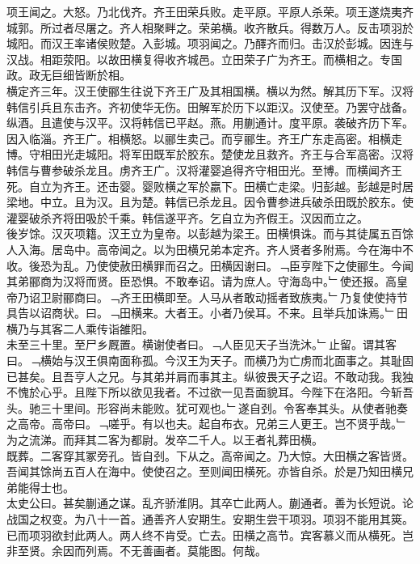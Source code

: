 \documentclass{zhvt-classic}
\begin{document}
\hspace*{2em}项王闻之。大怒。乃北伐齐。齐王田荣兵败。走平原。平原人杀荣。项王遂烧夷齐城郭。所过者尽屠之。齐人相聚畔之。荣弟横。收齐散兵。得数万人。反击项羽於城阳。而汉王率诸侯败楚。入彭城。项羽闻之。乃醳齐而归。击汉於彭城。因连与汉战。相距荥阳。以故田横复得收齐城邑。立田荣子广为齐王。而横相之。专国政。政无巨细皆断於相。\\
\hspace*{2em}横定齐三年。汉王使郦生往说下齐王广及其相国横。横以为然。解其历下军。汉将韩信引兵且东击齐。齐初使华无伤。田解军於历下以距汉。汉使至。乃罢守战备。纵酒。且遣使与汉平。汉将韩信已平赵。燕。用蒯通计。度平原。袭破齐历下军。因入临淄。齐王广。相横怒。以郦生卖己。而亨郦生。齐王广东走高密。相横走博。守相田光走城阳。将军田既军於胶东。楚使龙且救齐。齐王与合军高密。汉将韩信与曹参破杀龙且。虏齐王广。汉将灌婴追得齐守相田光。至博。而横闻齐王死。自立为齐王。还击婴。婴败横之军於嬴下。田横亡走梁。归彭越。彭越是时居梁地。中立。且为汉。且为楚。韩信已杀龙且。因令曹参进兵破杀田既於胶东。使灌婴破杀齐将田吸於千乘。韩信遂平齐。乞自立为齐假王。汉因而立之。\\
\hspace*{2em}後岁馀。汉灭项籍。汉王立为皇帝。以彭越为梁王。田横惧诛。而与其徒属五百馀人入海。居岛中。高帝闻之。以为田横兄弟本定齐。齐人贤者多附焉。今在海中不收。後恐为乱。乃使使赦田横罪而召之。田横因谢曰。﹁臣亨陛下之使郦生。今闻其弟郦商为汉将而贤。臣恐惧。不敢奉诏。请为庶人。守海岛中。﹂使还报。高皇帝乃诏卫尉郦商曰。﹁齐王田横即至。人马从者敢动摇者致族夷。﹂乃复使使持节具告以诏商状。曰。﹁田横来。大者王。小者乃侯耳。不来。且举兵加诛焉。﹂田横乃与其客二人乘传诣雒阳。\\
\hspace*{2em}未至三十里。至尸乡厩置。横谢使者曰。﹁人臣见天子当洗沐。﹂止留。谓其客曰。﹁横始与汉王俱南面称孤。今汉王为天子。而横乃为亡虏而北面事之。其耻固已甚矣。且吾亨人之兄。与其弟并肩而事其主。纵彼畏天子之诏。不敢动我。我独不愧於心乎。且陛下所以欲见我者。不过欲一见吾面貌耳。今陛下在洛阳。今斩吾头。驰三十里间。形容尚未能败。犹可观也。﹂遂自刭。令客奉其头。从使者驰奏之高帝。高帝曰。﹁嗟乎。有以也夫。起自布衣。兄弟三人更王。岂不贤乎哉。﹂为之流涕。而拜其二客为都尉。发卒二千人。以王者礼葬田横。\\
\hspace*{2em}既葬。二客穿其冢旁孔。皆自刭。下从之。高帝闻之。乃大惊。大田横之客皆贤。吾闻其馀尚五百人在海中。使使召之。至则闻田横死。亦皆自杀。於是乃知田横兄弟能得士也。\\
\hspace*{2em}太史公曰。甚矣蒯通之谋。乱齐骄淮阴。其卒亡此两人。蒯通者。善为长短说。论战国之权变。为八十一首。通善齐人安期生。安期生尝干项羽。项羽不能用其筴。已而项羽欲封此两人。两人终不肯受。亡去。田横之高节。宾客慕义而从横死。岂非至贤。余因而列焉。不无善画者。莫能图。何哉。\\
\end{document}
